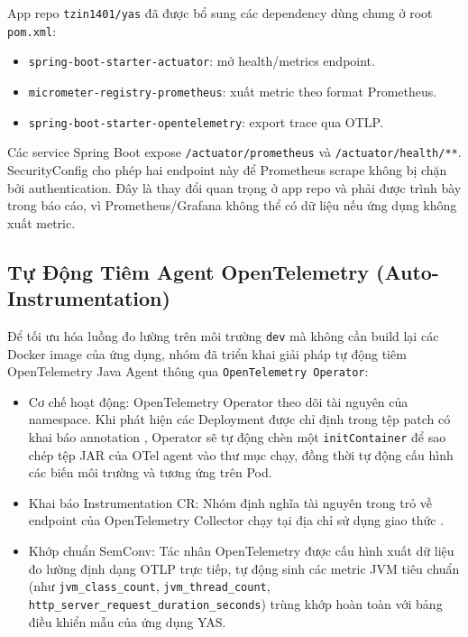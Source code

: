 App repo \texttt{tzin1401/yas} đã được bổ sung các dependency dùng chung ở root
\texttt{pom.xml}:

\begin{itemize}
    \item \texttt{spring-boot-starter-actuator}: mở health/metrics endpoint.
    \item \texttt{micrometer-registry-prometheus}: xuất metric theo format Prometheus.
    \item \texttt{spring-boot-starter-opentelemetry}: export trace qua OTLP.
\end{itemize}

Các service Spring Boot expose \texttt{/actuator/prometheus} và \texttt{/actuator/health/**}.
SecurityConfig cho phép hai endpoint này để Prometheus scrape không bị chặn bởi
authentication. Đây là thay đổi quan trọng ở app repo và phải được trình bày trong
báo cáo, vì Prometheus/Grafana không thể có dữ liệu nếu ứng dụng không xuất metric.

\subsection{Tự Động Tiêm Agent OpenTelemetry (Auto-Instrumentation)}

Để tối ưu hóa luồng đo lường trên môi trường \texttt{dev} mà không cần build lại các Docker image của ứng dụng, nhóm đã triển khai giải pháp tự động tiêm OpenTelemetry Java Agent thông qua \texttt{OpenTelemetry Operator}:

\begin{itemize}\sloppy
    \item Cơ chế hoạt động: OpenTelemetry Operator theo dõi tài nguyên của namespace. Khi phát hiện các Deployment được chỉ định trong tệp patch  có khai báo annotation , Operator sẽ tự động chèn một \texttt{initContainer} để sao chép tệp JAR của OTel agent vào thư mục chạy, đồng thời tự động cấu hình các biến môi trường  và  tương ứng trên Pod.
    \item Khai báo Instrumentation CR: Nhóm định nghĩa tài nguyên  trong  trỏ về endpoint của OpenTelemetry Collector chạy tại địa chỉ  sử dụng giao thức .
    \item Khớp chuẩn SemConv: Tác nhân OpenTelemetry được cấu hình xuất dữ liệu đo lường định dạng OTLP trực tiếp, tự động sinh các metric JVM tiêu chuẩn (như \texttt{jvm\_class\_count}, \texttt{jvm\_thread\_count}, \texttt{http\_server\_request\_duration\_seconds}) trùng khớp hoàn toàn với bảng điều khiển mẫu  của ứng dụng YAS.
\end{itemize}


